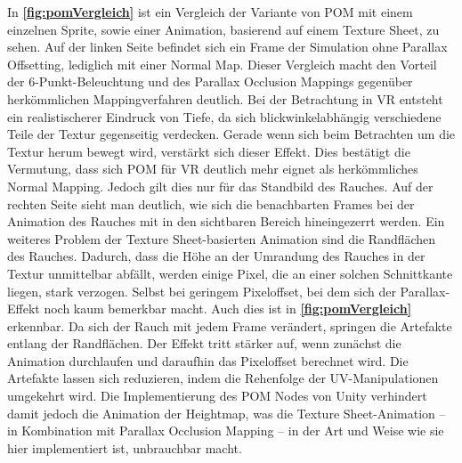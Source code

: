 In \textbf{\autoref{fig:pomVergleich}} ist ein Vergleich der Variante von POM mit einem einzelnen Sprite, sowie einer Animation, basierend auf einem Texture Sheet, zu sehen. 
Auf der linken Seite befindet sich ein Frame der Simulation ohne Parallax Offsetting, lediglich mit einer Normal Map. Dieser Vergleich macht den Vorteil der 6-Punkt-Beleuchtung und 
des Parallax Occlusion Mappings gegenüber herkömmlichen Mappingverfahren deutlich. 
Bei der Betrachtung in VR entsteht ein realistischerer Eindruck von Tiefe, da sich blickwinkelabhängig verschiedene Teile der Textur gegenseitig verdecken. Gerade wenn sich beim Betrachten
um die Textur herum bewegt wird, verstärkt sich dieser Effekt.  
Dies bestätigt die Vermutung, dass sich POM für VR deutlich mehr eignet als herkömmliches Normal Mapping. Jedoch gilt dies nur für das Standbild des Rauches.
Auf der rechten Seite sieht man deutlich, wie sich die benachbarten Frames bei der Animation des Rauches mit in den sichtbaren Bereich hineingezerrt werden.
Ein weiteres Problem der Texture Sheet-basierten Animation sind die Randflächen des Rauches. Dadurch, dass die Höhe an der Umrandung des Rauches in der Textur unmittelbar abfällt,
werden einige Pixel, die an einer solchen Schnittkante liegen, stark verzogen. Selbst bei geringem Pixeloffset, bei dem sich der Parallax-Effekt noch kaum bemerkbar macht. 
Auch dies ist in \textbf{\autoref{fig:pomVergleich}} erkennbar. Da sich der Rauch mit jedem Frame verändert, springen
die Artefakte entlang der Randflächen. Der Effekt tritt stärker auf, wenn zunächst die Animation durchlaufen und daraufhin das Pixeloffset berechnet wird. Die Artefakte lassen sich 
reduzieren, indem die Rehenfolge der UV-Manipulationen umgekehrt wird. Die Implementierung des POM Nodes von Unity verhindert damit jedoch die Animation der Heightmap, was 
die Texture Sheet-Animation – in Kombination mit Parallax Occlusion Mapping – in der Art und Weise wie sie hier implementiert ist, unbrauchbar macht. 

